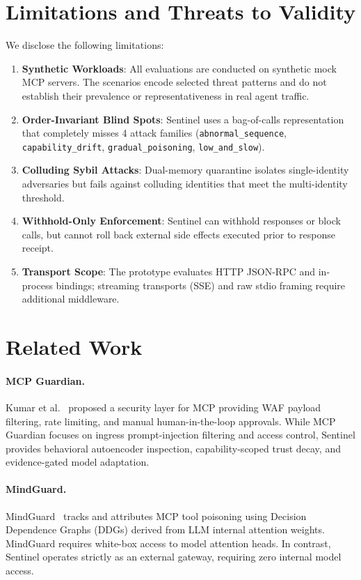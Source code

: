 \documentclass{llncs}
\begin{document}
\section{Limitations and Threats to Validity}
\label{sec:limitations}
We disclose the following limitations:
\begin{enumerate}
    \item \textbf{Synthetic Workloads}: All evaluations are conducted on synthetic mock MCP servers. The scenarios encode selected threat patterns and do not establish their prevalence or representativeness in real agent traffic.
    \item \textbf{Order-Invariant Blind Spots}: Sentinel uses a bag-of-calls representation that completely misses 4 attack families (\texttt{abnormal\_sequence}, \texttt{capability\_drift}, \texttt{gradual\_poisoning}, \texttt{low\_and\_slow}).
    \item \textbf{Colluding Sybil Attacks}: Dual-memory quarantine isolates single-identity adversaries but fails against colluding identities that meet the multi-identity threshold.
    \item \textbf{Withhold-Only Enforcement}: Sentinel can withhold responses or block calls, but cannot roll back external side effects executed prior to response receipt.
    \item \textbf{Transport Scope}: The prototype evaluates HTTP JSON-RPC and in-process bindings; streaming transports (SSE) and raw stdio framing require additional middleware.
\end{enumerate}

\section{Related Work}
\label{sec:related_work}
\paragraph{MCP Guardian.} Kumar et al.~\cite{kumar2025mcpguardian} proposed a security layer for MCP providing WAF payload filtering, rate limiting, and manual human-in-the-loop approvals. While MCP Guardian focuses on ingress prompt-injection filtering and access control, Sentinel provides behavioral autoencoder inspection, capability-scoped trust decay, and evidence-gated model adaptation.

\paragraph{MindGuard.} MindGuard~\cite{mindguard2025} tracks and attributes MCP tool poisoning using Decision Dependence Graphs (DDGs) derived from LLM internal attention weights. MindGuard requires white-box access to model attention heads. In contrast, Sentinel operates strictly as an external gateway, requiring zero internal model access.
\end{document}
